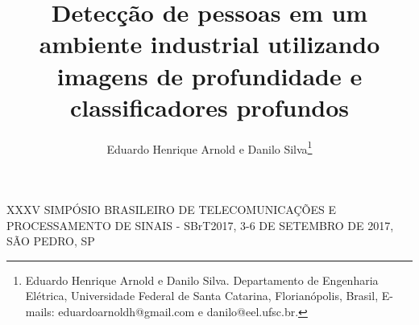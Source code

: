 \documentclass{sbrt2017port}
\begin{document}
\title{Detecção de pessoas em um ambiente industrial utilizando imagens de profundidade e classificadores profundos}

\author{Eduardo Henrique Arnold e Danilo Silva\thanks{Eduardo Henrique Arnold e Danilo Silva. Departamento de Engenharia Elétrica, Universidade Federal de Santa Catarina, Florianópolis, Brasil, E-mails: eduardoarnoldh@gmail.com e danilo@eel.ufsc.br. } 
\vspace{-3ex}
}

\maketitle

 {XXXV SIMPÓSIO BRASILEIRO DE TELECOMUNICAÇÕES E PROCESSAMENTO DE SINAIS - SBrT2017, 3-6 DE SETEMBRO DE 2017, SÃO PEDRO, SP}






\end{document}
